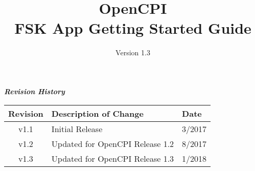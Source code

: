 \iffalse
This file is protected by Copyright. Please refer to the COPYRIGHT file
distributed with this source distribution.

This file is part of OpenCPI <http://www.opencpi.org>

OpenCPI is free software: you can redistribute it and/or modify it under the
terms of the GNU Lesser General Public License as published by the Free Software
Foundation, either version 3 of the License, or (at your option) any later
version.

OpenCPI is distributed in the hope that it will be useful, but WITHOUT ANY
WARRANTY; without even the implied warranty of MERCHANTABILITY or FITNESS FOR A
PARTICULAR PURPOSE. See the GNU Lesser General Public License for more details.

You should have received a copy of the GNU Lesser General Public License along
with this program. If not, see <http://www.gnu.org/licenses/>.
\fi

\def\docTitle{OpenCPI\\ FSK App Getting Started Guide}
\def\docVersion{1.3}

\date{Version \docVersion} %
\title{\docTitle}
\usepackage[T1]{fontenc} %
\usepackage{graphicx}
\graphicspath{ {figures/} }
\usepackage{textcomp}

\maketitle
\newpage

	\begin{center}
	\textit{\textbf{Revision History}}
		\begin{table}[H]
		\label{table:revisions} %
			\begin{tabularx}{\textwidth}{|c|X|l|}
			\hline
			\rowcolor{blue}
			\textbf{Revision} & \textbf{Description of Change} & \textbf{Date} \\
		    \hline
		    v1.1 & Initial Release & 3/2017 \\
		    \hline
		    v1.2 & Updated for OpenCPI Release 1.2 & 8/2017 \\
			\hline
			v1.3 & Updated for OpenCPI Release 1.3 & 1/2018 \\
			\hline
			\end{tabularx}
		\end{table}
	\end{center}

